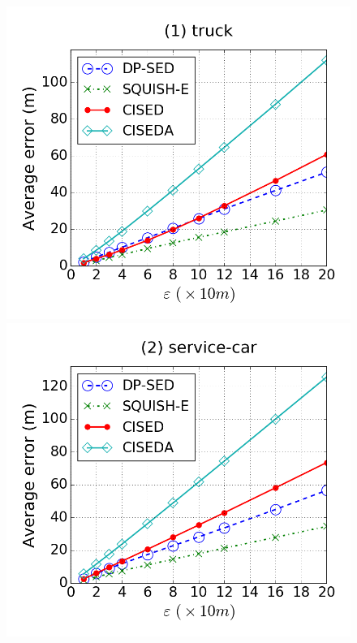 \begin{figure}[tb]
\centering
\includegraphics[scale = 0.245]{figures/Exp-error-epsilon-truck.png}
\includegraphics[scale = 0.245]{figures/Exp-error-epsilon-service.png}

\end{figure}
